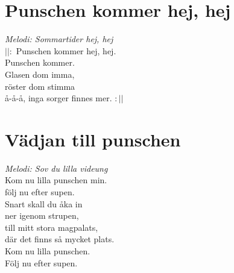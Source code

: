 \section{Punschen kommer hej, hej}
\textit{Melodi: Sommartider hej, hej}
\vspace{2mm}\\
$||:$ Punschen kommer hej, hej.\\
Punschen kommer.\\
Glasen dom imma,\\
röster dom stimma\\
å-å-å, inga sorger finnes mer. $:||$

\section{Vädjan till punschen}
\textit{Melodi: Sov du lilla videung}
\vspace{2mm}\\
Kom nu lilla punschen min.\\
följ nu efter supen.\\
Snart skall du åka in\\
ner igenom strupen,\\
till mitt stora magpalats,\\
där det finns så mycket plats.\\
Kom nu lilla punschen.\\
Följ nu efter supen.

